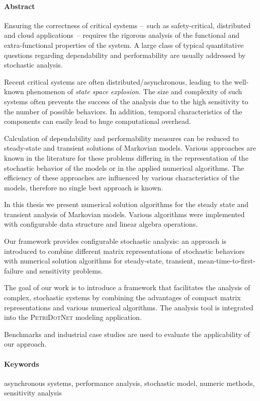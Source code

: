 \cleardoublepage

\paragraph*{Abstract}
{}
\thispagestyle{plain}

Ensuring the correctness of critical systems --~such as
safety-critical, distributed and cloud applications~-- requires the
rigorous analysis of the functional and extra-functional properties of
the system. A large class of typical quantitative questions regarding
dependability and performability are usually addressed by stochastic
analysis.

Recent critical systems are often distributed/asynchronous, leading to
the well-known phenomenon of \emph{state space explosion}. The size
and complexity of such systems often prevents the success of the
analysis due to the high sensitivity to the number of possible
behaviors. In addition, temporal characteristics of the components can
easily lead to huge computational overhead.

Calculation of dependability and performability measures can be
reduced to steady-state and transient solutions of Markovian
models. Various approaches are known in the literature for these
problems differing in the representation of the stochastic behavior of
the models or in the applied numerical algorithms. The efficiency of
these approaches are influenced by various characteristics of the
models, therefore no single best approach is known.

In this thesis we present numerical solution algorithms for the steady
state and transient analysis of Markovian models. Various algorithms
were implemented with configurable data structure and linear algebra
operations.

Our framework provides configurable stochastic analysis: an approach
is introduced to combine different matrix representations of stochastic
behaviors with numerical solution algorithms for steady-state,
transient, mean-time-to-first-failure and sensitivity problems. 

The goal of our work is to introduce a framework that facilitates the
analysis of complex, stochastic systems by combining the advantages of
compact matrix representations and various numerical algorithms. The
analysis tool is integrated into the \textsc{PetriDotNet} modeling
application.

Benchmarks and industrial case studies are used to evaluate the
applicability of our approach.

\paragraph{Keywords} asynchronous systems, performance analysis,
stochastic model, numeric methods, sensitivity analysis

